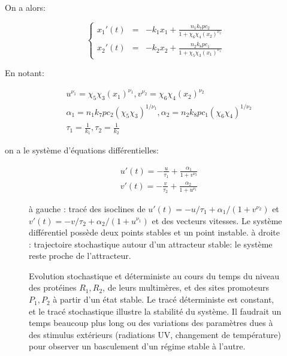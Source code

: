 \documentclass{article}
\begin{document}
On a alors:

\[
\left\{
\begin{array}{lll}
x_1'(t) & = &  -k_1x_1  + \frac{n_1 k_7 pc_2}{1+\chi_6\chi_4(x_2)^{\nu_2}}\\
x_2'(t) & = &  -k_2x_2  + \frac{n_2 k_8 pc_1}{1+\chi_5\chi_3(x_1)^{\nu_1}}
\end{array}
\right.
\]

En notant:


\[
\begin{split}
& u^{\nu_1} = \chi_5\chi_3(x_1)^{\nu_1} , v^{\nu_2} = \chi_6\chi_4(x_2)^{\nu_2}  \\
& \alpha_1=n_1k_7pc_2(\chi_5\chi_3)^{1/\nu_1}
,\alpha_2=n_2k_8pc_1(\chi_6\chi_4)^{1/\nu_2} \\
& \tau_1=\frac{1}{k_1} ,\tau_2=\frac{1}{k_2}
\end{split}
\]


on a le syst{\`e}me d'{\'e}quations diff{\'e}rentielles:

\[
\begin{split}
& u'(t)  =  -\frac{u}{\tau_1} + \frac{\alpha_1}{1+v^{\nu_2}}  \\
& v'(t)  =   -\frac{v}{\tau_2} + \frac{\alpha_2}{1+u^{\nu_1}}
\end{split}
\]


\begin{figure}[h]

\begin{center}
\epsfysize=3.5in 
\end{center}

{\large {\`a} gauche : trac{\'e} des isoclines de $u'(t)=-u/\tau_1
+\alpha_1/(1+v^{\nu_2})$ et
$v'(t)=-v/\tau_2+\alpha_2/(1+u^{\nu_1})$ et des vecteurs vitesses.
Le syst{\`e}me diff{\'e}rentiel poss{\`e}de deux points stables et un point
instable. {\`a} droite : trajectoire stochastique autour d'un
attracteur stable: le syst{\`e}me reste proche de l'attracteur. }
\label{figure7}
\end{figure}


\begin{figure}[h]


\begin{center}
\epsfysize=3.5in 
\end{center}


{\large Evolution stochastique et d{\'e}terministe au cours du temps
du niveau des prot{\'e}ines $R_1, R_2$, de leurs multim{\`e}res, et des
sites promoteurs $P_1, P_2$ {\`a} partir d'un {\'e}tat stable. Le trac{\'e}
d{\'e}terministe est constant, et le trac{\'e} stochastique illustre la
stabilit{\'e} du syst{\`e}me. Il faudrait un temps beaucoup plus long ou
des variations des param{\`e}tres dues {\`a} des stimulus ext{\'e}rieurs
(radiations UV, changement de temp{\'e}rature) pour observer un
basculement d'un r{\'e}gime stable {\`a} l'autre. }\label{figure8}
\end{figure}
\end{document}
